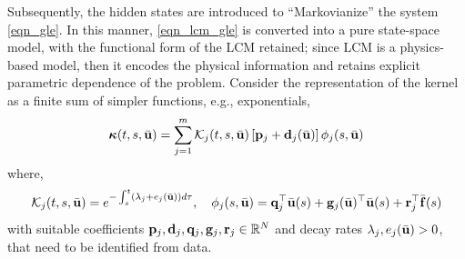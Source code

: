 Subsequently, the hidden states are introduced to ``Markovianize'' the system \cref{eqn_gle}. In this manner, \cref{eqn_lcm_gle} is converted into a pure state-space model, with the functional form of the LCM retained; since LCM is a physics-based model, then it encodes the physical information and retains explicit parametric dependence of the problem. Consider the representation of the kernel as a finite sum of simpler functions, e.g., exponentials,
\begin{equation}
    \boldsymbol{\kappa}(t,s,\bar{\mathbf{u}}) = \sum_{j=1}^{m}\mathcal{K}_j(t,s,\bar{\mathbf{u}})\left[\mathbf{p}_j + \mathbf{d}_j(\bar{\mathbf{u}})\right]\phi_j(s,\bar{\mathbf{u}})
\end{equation}
where,
\begin{equation}
    \mathcal{K}_j(t,s,\bar{\mathbf{u}}) = e^{-\int_{s}^{t}\left(\lambda_j + e_j(\bar{\mathbf{u}})\right)d\tau},\quad \phi_j(s,\bar{\mathbf{u}}) = \mathbf{q}_j^{\top}\bar{\mathbf{u}}(s) + \mathbf{g}_j(\bar{\mathbf{u}})^{\top}\bar{\mathbf{u}}(s) + \mathbf{r}_j^{\top}\bar{\mathbf{f}}(s)
\end{equation}
with suitable coefficients $\mathbf{p}_j,\mathbf{d}_j,\mathbf{q}_j,\mathbf{g}_j,\mathbf{r}_j\in\mathbb{R}^{N}$ and decay rates $\lambda_j,e_j(\bar{\mathbf{u}})>0$, that need to be identified from data. 

